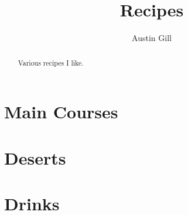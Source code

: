 \documentclass{article}
\title{Recipes}
\author{Austin Gill}
\begin{document}
    \maketitle
    \begin{abstract}
        Various recipes I like. 
    \end{abstract}
    \thispagestyle{empty}

    \newpage
    \tableofcontents

    \newpage
    \section{Main Courses}\label{sec:main-courses}
        

    \newpage
    \section{Deserts}\label{sec:deserts}
        

    \newpage
    \section{Drinks}\label{sec:drinks}
        
\end{document}
